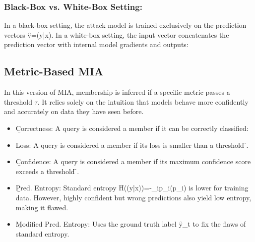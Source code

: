 \subsubsection*{Black-Box vs. White-Box Setting:}
In a black-box setting, the attack model is trained exclusively on the prediction vectors \f{v=(y|x)}. In a white-box setting, the input vector concatenates the prediction vector with internal model gradients and outputs:



\subsection{Metric-Based MIA}
In this version of MIA, membership is inferred if a specific metric passes a threshold $\tau$. It relies solely on the intuition that models behave more confidently and accurately on data they have seen before.
\begin{itemize}
    \item[M1.] \b{Correctness}: A query is considered a member if it can be correctly classified:
    \item[M2.] \b{Loss}: A query is considered a member if its loss is smaller than a threshold \f{\tau}.
    \item[M3.] \b{Confidence}: A query is considered a member if its maximum confidence score exceeds a threshold \f{\tau}.
\end{itemize}
\vspace{1em}
\begin{itemize}
    \item[M4.] \b{Pred. Entropy}: Standard entropy \f{H((y|x))=-\sum_{i}p_{i}\log(p_{i})} is lower for training data. However, highly confident but wrong predictions also yield low entropy, making it flawed.
    \item[M5.] \b{Modified Pred. Entropy}: Uses the ground truth label \f{y_t} to fix the flaws of standard entropy.
\end{itemize}



